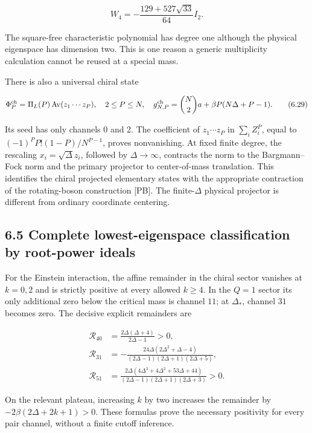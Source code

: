 \[
W_4=-\frac{129+527\sqrt{33}}{64}I_2.
\tag{6.28}
\]

The square-free characteristic polynomial has degree one although the physical eigenspace has dimension two. This is one reason a generic multiplicity calculation cannot be reused at a special mass.

There is also a universal chiral state

\[
\Phi_P^{\rm ch}=\Pi_L(P)\operatorname{Av}(z_1\cdots z_P),
\quad 2\le P\le N,
\quad
g_{N,P}^{\rm ch}=\binom N2a+\beta P(N\Delta+P-1).
\tag{6.29}
\]

Its seed has only channels 0 and 2. The coefficient of \(z_1\cdots z_P\) in \(\sum_iZ_i^P\), equal to \((-1)^PP!(1-P)/N^{P-1}\), proves nonvanishing. At fixed finite degree, the rescaling \(x_i=\sqrt\Delta z_i\), followed by \(\Delta\to\infty\), contracts the norm to the Bargmann--Fock norm and the primary projector to center-of-mass translation. This identifies the chiral projected elementary states with the appropriate contraction of the rotating-boson construction {[}PB{]}. The finite-\(\Delta\) physical projector is different from ordinary coordinate centering.

\hypertarget{complete-lowest-eigenspace-classification-by-root-power-ideals}{%
\subsection{6.5 Complete lowest-eigenspace classification by root-power ideals}\label{complete-lowest-eigenspace-classification-by-root-power-ideals}}

For the Einstein interaction, the affine remainder in the chiral sector vanishes at \(k=0,2\) and is strictly positive at every allowed \(k\ge4\). In the \(Q=1\) sector its only additional zero below the critical mass is channel \(11\); at \(\Delta_*\), channel \(31\) becomes zero. The decisive explicit remainders are

\[
\begin{aligned}
\mathcal R_{40}&=\frac{2\Delta(\Delta+4)}{2\Delta-1}>0,\\
\mathcal R_{31}&=-\frac{24\Delta(2\Delta^2+\Delta-4)}{(2\Delta-1)(2\Delta+1)(2\Delta+5)},\\
\mathcal R_{51}&=\frac{2\Delta(4\Delta^3+4\Delta^2+53\Delta+44)}
{(2\Delta-1)(2\Delta+1)(2\Delta+3)}>0.
\end{aligned}
\tag{6.30}
\]

On the relevant plateau, increasing \(k\) by two increases the remainder by \(-2\beta(2\Delta+2k+1)>0\). These formulas prove the necessary positivity for every pair channel, without a finite cutoff inference.

